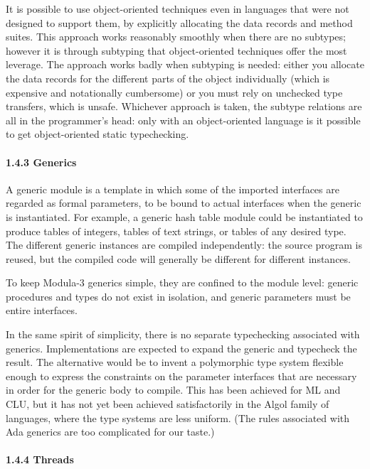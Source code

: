 \documentclass[10pt]{article}
\begin{document}
It is possible to use object-oriented techniques even in languages that were
not designed to support them, by explicitly allocating the data records and
method suites.  This approach works reasonably smoothly when there are no
subtypes; however it is through subtyping that object-oriented techniques
offer the most leverage.  The approach works badly when subtyping is needed:
either you allocate the data records for the different parts of the object
individually (which is expensive and notationally cumbersome) or you must rely
on unchecked type transfers, which is unsafe.  Whichever approach is taken, the
subtype relations are all in the programmer's head: only with an
object-oriented language is it possible to get object-oriented static
typechecking.

\paragraph{1.4.3 Generics}

A generic module is a template in which some of the imported interfaces are
regarded as formal parameters, to be bound to actual interfaces when the
generic is instantiated.  For example, a generic hash table module could be
instantiated to produce tables of integers, tables of text strings, or tables
of any desired type.  The different generic instances are compiled
independently: the source program is reused, but the compiled code will
generally be different for different instances.

To keep Modula-3 generics simple, they are confined to the module level:
generic procedures and types do not exist in isolation, and generic parameters
must be entire interfaces.

In the same spirit of simplicity, there is no separate typechecking associated
with generics.  Implementations are expected to expand the generic and
typecheck the result.  The alternative would be to invent a polymorphic type
system flexible enough to express the constraints on the parameter interfaces
that are necessary in order for the generic body to compile.  This has been
achieved for ML and CLU, but it has not yet been achieved satisfactorily in
the Algol family of languages, where the type systems are less uniform.  (The
rules associated with Ada generics are too complicated for our taste.)

\paragraph{1.4.4 Threads}
\end{document}
